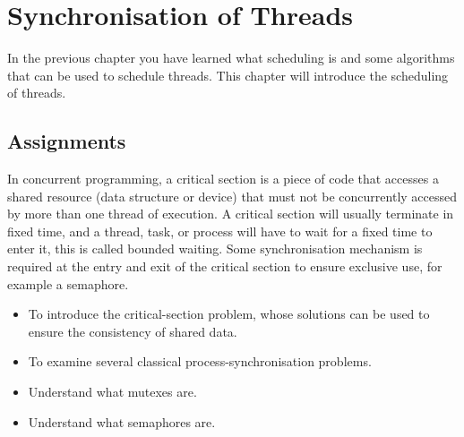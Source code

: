 \chapter[Session 5: Synchronisation of Threads]{Synchronisation of Threads}\label{chap:session5}
In the previous chapter you have learned what scheduling is and some algorithms that can be used to schedule threads. This chapter will introduce the scheduling of threads.

\section{Assignments}
In concurrent programming, a critical section is a piece of code that accesses a shared resource (data structure or device) that must not be concurrently accessed by more than one thread of execution. A critical section will usually terminate in fixed time, and a thread, task, or process will have to wait for a fixed time to enter it, this is called bounded waiting. Some synchronisation mechanism is required at the entry and exit of the critical section to ensure exclusive use, for example a semaphore.

\begin{itemize}
\item To introduce the critical-section problem, whose solutions can be used to ensure the consistency of shared data.
\item To examine several classical process-synchronisation problems.
\item Understand what mutexes are.
\item Understand what semaphores are.
\end{itemize}

